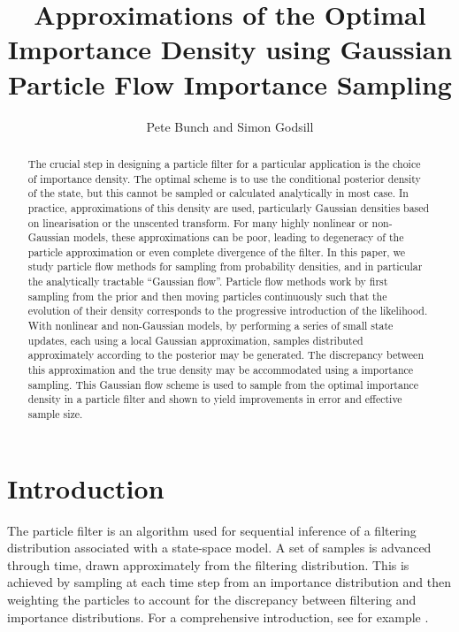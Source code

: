 \documentclass[12pt]{article}
\title{Approximations of the Optimal Importance Density using Gaussian Particle Flow Importance Sampling}
\author{Pete Bunch and Simon Godsill}
\date{}
\begin{document}
\maketitle

\begin{abstract}
The crucial step in designing a particle filter for a particular application is the choice of importance density. The optimal scheme is to use the conditional posterior density of the state, but this cannot be sampled or calculated analytically in most case. In practice, approximations of this density are used, particularly Gaussian densities based on linearisation or the unscented transform. For many highly nonlinear or non-Gaussian models, these approximations can be poor, leading to degeneracy of the particle approximation or even complete divergence of the filter. In this paper, we study particle flow methods for sampling from probability densities, and in particular the analytically tractable ``Gaussian flow''. Particle flow methods work by first sampling from the prior and then moving particles continuously such that the evolution of their density corresponds to the progressive introduction of the likelihood. With nonlinear and non-Gaussian models, by performing a series of small state updates, each using a local Gaussian approximation, samples distributed approximately according to the posterior may be generated. The discrepancy between this approximation and the true density may be accommodated using a importance sampling. This Gaussian flow scheme is used to sample from the optimal importance density in a particle filter and shown to yield improvements in error and effective sample size.
\end{abstract}






\section{Introduction}

The particle filter is an algorithm used for sequential inference of a filtering distribution associated with a state-space model. A set of samples is advanced through time, drawn approximately from the filtering distribution. This is achieved by sampling at each time step from an importance distribution and then weighting the particles to account for the discrepancy between filtering and importance distributions. For a comprehensive introduction, see for example \citep{Cappe2007,Doucet2009}.
\end{document}
